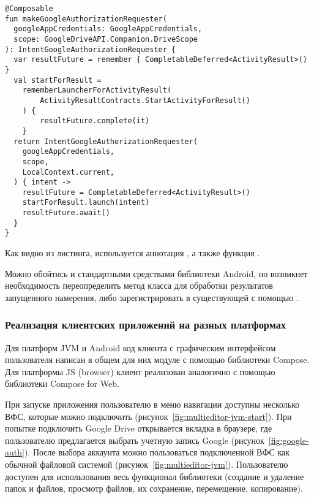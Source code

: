     \begin{verbatim}
@Composable
fun makeGoogleAuthorizationRequester(
  googleAppCredentials: GoogleAppCredentials,
  scope: GoogleDriveAPI.Companion.DriveScope
): IntentGoogleAuthorizationRequester {
  var resultFuture = remember { CompletableDeferred<ActivityResult>() }
  val startForResult =
    rememberLauncherForActivityResult(
        ActivityResultContracts.StartActivityForResult()
    ) {
        resultFuture.complete(it)
    }
  return IntentGoogleAuthorizationRequester(
    googleAppCredentials,
    scope,
    LocalContext.current,
  ) { intent ->
    resultFuture = CompletableDeferred<ActivityResult>()
    startForResult.launch(intent)
    resultFuture.await()
  }
}
    \end{verbatim}
    Как видно из листинга, используется аннотация , а также функция . 
    
    Можно обойтись и стандартными средствами библиотеки Android, но возникнет необходимость переопределить метод  класса  для обработки результатов запущенного намерения, либо зарегистрировать  в существующей  с помощью .
    
  \subsubsection{Реализация клиентских приложений на разных платформах}
    Для платформ JVM и Android код клиента с графическим интерфейсом пользователя написан в общем для них модуле с помощью библиотеки Compose\cite{gh-compose-jb}. Для платформы JS (browser) клиент реализован аналогично с помощью библиотеки Compose for Web.


    При запуске приложения пользователю в меню навигации доступны несколько ВФС, которые можно подключить (рисунок~\ref{fig:multieditor-jvm-start}). При попытке подключить Google Drive открывается вкладка в браузере, где пользователю предлагается выбрать учетную запись Google (рисунок~\ref{fig:google-auth}). После выбора аккаунта можно пользоваться подключенной ВФС как обычной файловой системой (рисунок~\ref{fig:multieditor-jvm}). Пользователю доступен для использования весь функционал библиотеки (создание и удаление папок и файлов, просмотр файлов, их сохранение, перемещение, копирование).

